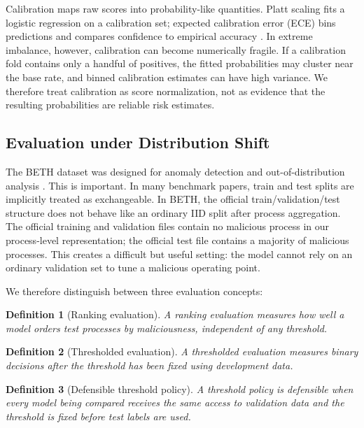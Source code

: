 \documentclass[10pt,journal,compsoc]{IEEEtran}
\newtheorem{definition}{Definition}
\begin{document}
Calibration maps raw scores into probability-like quantities. Platt scaling \cite{platt1999} fits a logistic regression on a calibration set; expected calibration error (ECE) bins predictions and compares confidence to empirical accuracy \cite{guo2017}. In extreme imbalance, however, calibration can become numerically fragile. If a calibration fold contains only a handful of positives, the fitted probabilities may cluster near the base rate, and binned calibration estimates can have high variance. We therefore treat calibration as score normalization, not as evidence that the resulting probabilities are reliable risk estimates.

\subsection{Evaluation under Distribution Shift}

The BETH dataset was designed for anomaly detection and out-of-distribution analysis \cite{highnam2021}. This is important. In many benchmark papers, train and test splits are implicitly treated as exchangeable. In BETH, the official train/validation/test structure does not behave like an ordinary IID split after process aggregation. The official training and validation files contain no malicious process in our process-level representation; the official test file contains a majority of malicious processes. This creates a difficult but useful setting: the model cannot rely on an ordinary validation set to tune a malicious operating point.

We therefore distinguish between three evaluation concepts:
\begin{definition}[Ranking evaluation]
A ranking evaluation measures how well a model orders test processes by maliciousness, independent of any threshold.
\end{definition}

\begin{definition}[Thresholded evaluation]
A thresholded evaluation measures binary decisions after the threshold has been fixed using development data.
\end{definition}

\begin{definition}[Defensible threshold policy]
A threshold policy is defensible when every model being compared receives the same access to validation data and the threshold is fixed before test labels are used.
\end{definition}
\end{document}
